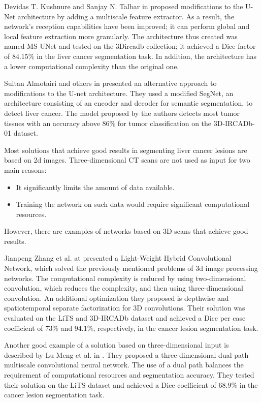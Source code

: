 Devidas T. Kushnure and Sanjay N. Talbar in \cite{kushnure_ms-unet_2021} proposed modifications to the U-Net architecture by adding a multiscale feature extractor. As a result, the network's reception capabilities have been improved; it can perform global and local feature extraction more granularly. The architecture thus created was named MS-UNet and tested on the 3Dircadb collection; it achieved a Dice factor of $84.15\%$ in the liver cancer segmentation task. In addition, the architecture has a lower computational complexity than the original one.

Sultan Almotairi and others in \cite{almotairi_liver_2020} presented an alternative approach to modifications to the U-net architecture. They used a modified SegNet, an architecture consisting of an encoder and decoder for semantic segmentation, to detect liver cancer. The model proposed by the authors detects most tumor tissues with an accuracy above $86\%$ for tumor classification on the 3D-IRCADb-01 dataset.

Most solutions that achieve good results in segmenting liver cancer lesions are based on 2d images. Three-dimensional CT scans are not used as input for two main reasons:
\begin{itemize}
    \item It significantly limits the amount of data available.
    \item Training the network on such data would require significant computational resources.
\end{itemize}
However, there are examples of networks based on 3D scans that achieve good results. 

Jianpeng Zhang et al. at \cite{zhang_light-weight_2019} presented a Light-Weight Hybrid Convolutional Network, which solved the previously mentioned problems of 3d image processing networks. The computational complexity is reduced by using two-dimensional convolution, which reduces the complexity, and then using three-dimensional convolution. An additional optimization they proposed is depthwise and spatiotemporal separate factorization for 3D convolutions. Their solution was evaluated on the LiTS and 3D-IRCADb dataset and achieved a Dice per case coefficient of $73\%$ and $94.1\%$, respectively, in the cancer lesion segmentation task.

Another good example of a solution based on three-dimensional input is described by Lu Meng et al. in \cite{meng_liver_2020}. They proposed a three-dimensional dual-path multiscale convolutional neural network. The use of a dual path balances the requirement of computational resources and segmentation accuracy. They tested their solution on the LiTS dataset and achieved a Dice coefficient of $68.9\%$ in the cancer lesion segmentation task.

